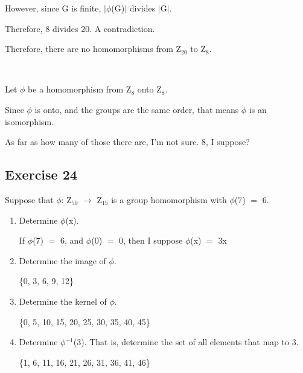 \documentclass{article}
\newcommand{\mt}[1]{\ensuremath{#1}}
\newcommand\ssc[2][\DefaultOpt]{%
  \def\DefaultOpt{#2}%
  \subsection[#1]{#2}%
}
\newcommand{\balist}{\begin{enumerate}[label=\alph*.]}
\newcommand{\elist}{\end{enumerate}}
\newcommand{\lra}{ \mt{\longrightarrow} } %
\newcommand{\av}[1]{\mt{|}#1\mt{|}}  %
\newcommand{\bk}[1]{\{#1\}}
\newcommand{\eql}{\mt{=} }
\newcommand{\uw}[2]{#1\mt{_{#2}}}
\newcommand{\uf}[2]{#1\mt{^{#2}}}
\begin{document}
{{However, since G is finite, \av{$\phi$(G)} divides \av{G}.

Therefore, 8 divides 20. A contradiction.

Therefore, there are no homomorphisms from \uw{Z}{20} to \uw{Z}{8}.

\

Let $\phi$ be a homomorphism from \uw{Z}{8} onto \uw{Z}{8}.

Since $\phi$ is onto, and the groups are the same order, that means $\phi$ is an isomorphism.

As far as how many of those there are, I'm not sure. 8, I suppose?

}

\ssc{Exercise 24}{

Suppose that $\phi$: \uw{Z}{50} \lra \uw{Z}{15} is a group homomorphism with $\phi$(7) \eql 6.

\balist
\item Determine $\phi$(x).

If $\phi$(7) \eql 6, and $\phi$(0) \eql 0, then I suppose $\phi$(x) \eql 3x

\item Determine the image of $\phi$.

\bk{0, 3, 6, 9, 12}

\item Determine the kernel of $\phi$.

\bk{0, 5, 10, 15, 20, 25, 30, 35, 40, 45}

\item Determine $\uf{\phi}{-1}$(3). That is, determine the set of all elements that map to 3.

\bk{1, 6, 11, 16, 21, 26, 31, 36, 41, 46}

\elist

}
}
\end{document}
